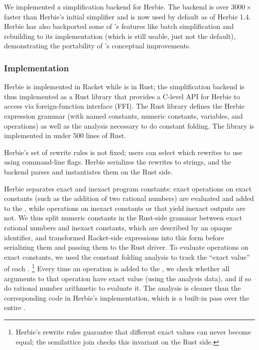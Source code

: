 We implemented a \egg simplification backend for Herbie.
The \egg backend is over $3000\times$ faster than Herbie's initial simplifier and
  is now used by default as of Herbie 1.4.
Herbie has also backported some of \egg's features like batch simplification and
  rebuilding to its \egraph implementation
  (which is still usable, just not the default),
  demonstrating the portability of \egg's conceptual improvements.

\subsubsection{Implementation}

Herbie is implemented in Racket while \egg is in Rust;
  the \egg simplification backend is thus implemented as a Rust library that
  provides a C-level API for Herbie to access via foreign-function interface (FFI).
The Rust library defines the Herbie expression grammar
  (with named constants, numeric constants, variables, and operations)
  as well as the \eclass analysis necessary to do constant folding.
The library is implemented in under 500 lines of Rust.

Herbie's set of rewrite rules is not fixed;
  users can select which rewrites to use using command-line flags.
Herbie serializes the rewrites to strings,
  and the \egg backend parses and instantiates them on the Rust side.

Herbie separates exact and inexact program constants:
  exact operations on exact constants
  (such as the addition of two rational numbers)
  are evaluated and added to the \egraph,
  while operations on inexact constants or that yield inexact outputs
  are not.
We thus split numeric constants in the Rust-side grammar
  between exact rational numbers and inexact constants,
  which are described by an opaque identifier,
  and transformed Racket-side expressions into this form
  before serializing them and passing them to the Rust driver.
To evaluate operations on exact constants,
  we used the constant folding \eclass analysis
  to track the ``exact value'' of each \eclass.%
\footnote{Herbie's rewrite rules guarantee that different exact values
  can never become equal; the semilattice \textsf{join} checks this invariant on the Rust side.}
Every time an operation \enode is added to the \egg \egraph,
  we check whether all arguments to that operation have exact value (using the analysis data),
  and if so do rational number arithmetic to evaluate it.
The \eclass analysis is cleaner than the corresponding code in Herbie's implementation,
  which is a built-in pass over the entire \egraph.

